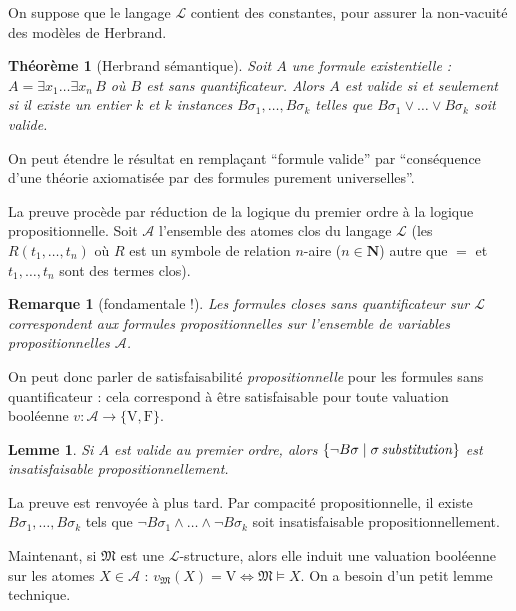\documentclass[a4paper, 11pt]{article}
\newtheorem*{theorem}{Théorème}
\newtheorem*{lemma}{Lemme}
\newtheorem*{remark}{Remarque}
\begin{document}
On suppose que le langage $\mathcal{L}$ contient des constantes, pour assurer la non-vacuité
des modèles de Herbrand.

\begin{theorem}[Herbrand sémantique]
  Soit $A$ une formule existentielle : $A = \exists x_1 \ldots \exists x_n\,B$
  où $B$ est sans quantificateur. Alors $A$ est valide si et seulement si il
  existe un entier $k$ et $k$ instances $B\sigma_1, \ldots, B\sigma_k$ telles
  que $B\sigma_1 \lor \ldots \lor B\sigma_k$ soit valide.
\end{theorem}

On peut étendre le résultat en remplaçant \enquote{formule valide} par
\enquote{conséquence d'une théorie axiomatisée par des formules purement
  universelles}.

La preuve procède par réduction de la logique du premier ordre à la logique
propositionnelle. Soit $\mathcal{A}$ l'ensemble des atomes clos du langage
$\mathcal{L}$ (les $R(t_1, \ldots, t_n)$ où $R$ est un symbole de relation
$n$-aire ($n \in \mathbf{N}$) autre que $=$ et $t_1, \ldots, t_n$ sont des
termes clos).

\begin{remark}[fondamentale !]
  Les formules closes sans quantificateur sur $\mathcal{L}$ correspondent aux
  formules propositionnelles sur l'ensemble de variables propositionnelles
  $\mathcal{A}$.
\end{remark}

On peut donc parler de satisfaisabilité \emph{propositionnelle} pour les
formules sans quantificateur : cela correspond à être satisfaisable pour toute
valuation booléenne $v : \mathcal{A} \to \{\mathrm{V}, \mathrm{F}\}$.

\begin{lemma}
  Si $A$ est valide au premier ordre, alors $\{\lnot B\sigma \mid \sigma\,
  \text{\emph{substitution}} \}$ est insatisfaisable propositionnellement.
\end{lemma}

La preuve est renvoyée à plus tard. Par compacité propositionnelle, il existe
$B\sigma_1, \ldots, B\sigma_k$ tels que $\lnot B\sigma_1 \land \ldots \land
\lnot B\sigma_k$ soit insatisfaisable propositionnellement.

Maintenant, si $\mathfrak{M}$ est une $\mathcal{L}$-structure, alors elle induit
une valuation booléenne sur les atomes $X \in \mathcal{A}$ :
$v_{\mathfrak{M}}(X) = \mathrm{V} \Leftrightarrow \mathfrak{M} \models X$. On a
besoin d'un petit lemme technique.
\end{document}
